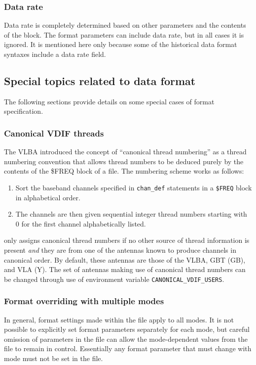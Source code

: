 \documentclass[12pt]{article}
\begin{document}
\subsubsection{Data rate}

Data rate is completely determined based on other parameters and the contents of the  block.
The format parameters can include data rate, but in all cases it is ignored.
It is mentioned here only because some of the historical data format syntaxes include a data rate field.

\subsection{Special topics related to data format}

The following sections provide details on some special cases of format specification.

\subsubsection{Canonical VDIF threads} \label{sec:canonicalthreads}

The VLBA introduced the concept of ``canonical thread numbering'' as a thread numbering convention that allows thread numbers to be deduced purely by the contents of the {\$FREQ} block of a \vx file.
The numbering scheme works as follows:
\begin{enumerate}
\item Sort the baseband channels specified in {\tt chan\_def} statements in a {\tt \$FREQ} block in alphabetical order.
\item The channels are then given sequential integer thread numbers starting with 0 for the first channel alphabetically listed.
\end{enumerate}
\vexdifx only assigns canonical thread numbers if no other source of thread information is present {\em and} they are from one of the antennas known to produce channels in canonical order.
By default, these antennas are those of the VLBA, GBT (GB), and VLA (Y).
The set of antennas making use of canonical thread numbers can be changed through use of environment variable {\tt CANONICAL\_VDIF\_USERS}.

\subsubsection{Format overriding with multiple modes}

In general, format settings made within the \vd file apply to all modes.
It is not possible to explicitly set format parameters separately for each mode, but careful omission of parameters in the \vd file can allow the mode-dependent values from the \vx file to remain in control.
Essentially any format parameter that must change with mode must not be set in the \vd file.
\end{document}
